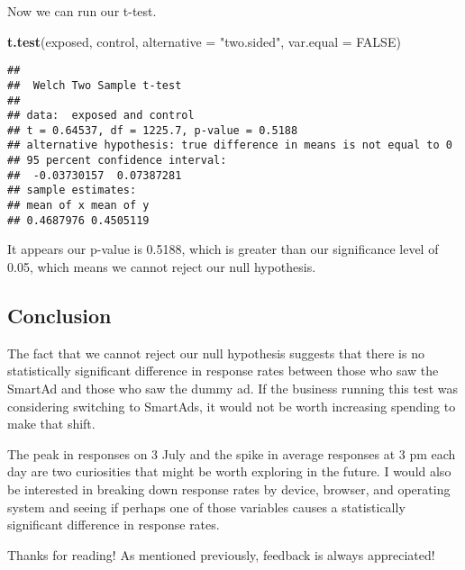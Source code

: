\documentclass[
]{article}
\newenvironment{Shaded}{\begin{snugshade}}{\end{snugshade}}
\newcommand{\AttributeTok}[1]{\textcolor[rgb]{0.13,0.29,0.53}{#1}}
\newcommand{\ConstantTok}[1]{\textcolor[rgb]{0.56,0.35,0.01}{#1}}
\newcommand{\FunctionTok}[1]{\textcolor[rgb]{0.13,0.29,0.53}{\textbf{#1}}}
\newcommand{\NormalTok}[1]{#1}
\newcommand{\StringTok}[1]{\textcolor[rgb]{0.31,0.60,0.02}{#1}}
\begin{document}
Now we can run our t-test.

\begin{Shaded}
\begin{Highlighting}[]
\FunctionTok{t.test}\NormalTok{(exposed, control, }\AttributeTok{alternative =} \StringTok{"two.sided"}\NormalTok{, }\AttributeTok{var.equal =} \ConstantTok{FALSE}\NormalTok{)}
\end{Highlighting}
\end{Shaded}

\begin{verbatim}
## 
##  Welch Two Sample t-test
## 
## data:  exposed and control
## t = 0.64537, df = 1225.7, p-value = 0.5188
## alternative hypothesis: true difference in means is not equal to 0
## 95 percent confidence interval:
##  -0.03730157  0.07387281
## sample estimates:
## mean of x mean of y 
## 0.4687976 0.4505119
\end{verbatim}

It appears our p-value is 0.5188, which is greater than our significance
level of 0.05, which means we cannot reject our null hypothesis.

\hypertarget{conclusion}{%
\subsection{Conclusion}\label{conclusion}}

The fact that we cannot reject our null hypothesis suggests that there
is no statistically significant difference in response rates between
those who saw the SmartAd and those who saw the dummy ad. If the
business running this test was considering switching to SmartAds, it
would not be worth increasing spending to make that shift.

The peak in responses on 3 July and the spike in average responses at 3
pm each day are two curiosities that might be worth exploring in the
future. I would also be interested in breaking down response rates by
device, browser, and operating system and seeing if perhaps one of those
variables causes a statistically significant difference in response
rates.

Thanks for reading! As mentioned previously, feedback is always
appreciated!
\end{document}

